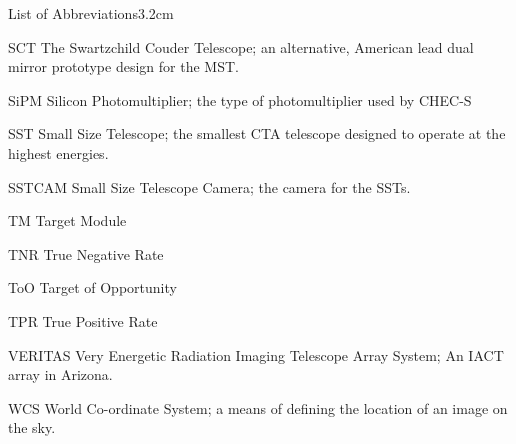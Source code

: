 \begin{mclistof}{List of Abbreviations}{3.2cm}
\item[SCT] The Swartzchild Couder Telescope; an alternative, American lead dual mirror prototype design for the MST.
\item[SiPM] Silicon Photomultiplier; the type of photomultiplier used by CHEC-S
\item[SST] Small Size Telescope; the smallest CTA telescope designed to operate at the highest energies.
\item[SSTCAM] Small Size Telescope Camera; the camera for the SSTs.
\item[TM] Target Module
\item[TNR] True Negative Rate
\item[ToO] Target of Opportunity
\item[TPR] True Positive Rate
\item[VERITAS] Very Energetic Radiation Imaging Telescope Array System; An IACT array in Arizona.
\item[WCS] World Co-ordinate System; a means of defining the location of an image on the sky.
\end{mclistof} 

